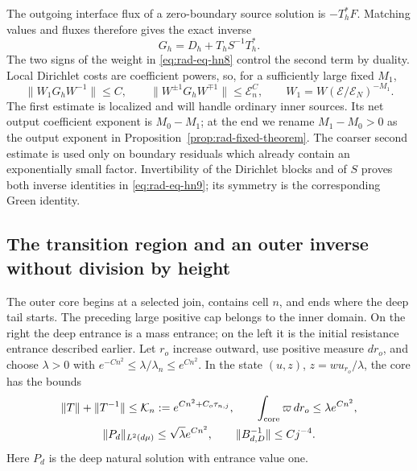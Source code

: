 The outgoing interface flux of a zero-boundary source solution is
$-T_h^*F$.  Matching values and fluxes therefore gives the exact inverse
\begin{equation}\label{eq:rad-eq-hn9}
 G_h=D_h+T_hS^{-1}T_h^*.
\end{equation}
The two signs of the weight in \eqref{eq:rad-eq-hn8} control the second
term by duality.  Local Dirichlet costs are coefficient powers, so,
for a sufficiently large fixed $M_1$,
\begin{equation}\label{eq:inner-inverse-estimates-new}
 \|W_1G_hW^{-1}\|\le C,\qquad
 \|W^{\pm1}G_hW^{\mp1}\|\le\mathcal E_n^C,
 \qquad W_1=W(\mathcal E/\mathcal E_N)^{-M_1}.
\end{equation}
The first estimate is localized and will handle ordinary inner sources.
Its net output coefficient exponent is $M_0-M_1$; at the end we rename
$M_1-M_0>0$ as the output exponent in
Proposition~\ref{prop:rad-fixed-theorem}.
The coarser second estimate is used only on boundary residuals which
already contain an exponentially small factor.  Invertibility of the
Dirichlet blocks and of $S$ proves both inverse identities in
\eqref{eq:rad-eq-hn9}; its symmetry is the corresponding Green identity.

\subsection{The transition region and an outer inverse without division by height}

The outer core begins at a selected join, contains cell $n$, and ends
where the deep tail starts.  The preceding large positive cap belongs
to the inner domain.  On the right the deep entrance is a mass entrance;
on the left it is the initial resistance entrance described earlier.
Let $r_o$ increase outward, use positive measure $dr_o$, and choose
$\lambda>0$ with $e^{-Cn^2}\le\lambda/\lambda_n\le e^{Cn^2}$.
In the state $(u,z)$, $z=wu_{r_o}/\lambda$, the core has the bounds
\begin{equation}\label{eq:transition-inputs-new}
 \begin{gathered}
 \|T\|+\|T^{-1}\|\le\mathcal K_n:=e^{Cn^2+C_o\tau_{n,j}},
 \qquad \int_{\rm core}\varpi\,dr_o\le\lambda e^{Cn^2},\\
 \|P_d\|_{L^2(d\mu)}\le\sqrt\lambda e^{Cn^2},
 \qquad \|B_{d,D}^{-1}\|\le Cj^{-4}.
 \end{gathered}
\end{equation}
Here $P_d$ is the deep natural solution with entrance value one.


